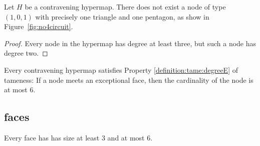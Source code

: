 \begin{lemma}\label{lemma:nobad4}
Let $H$ be a contravening hypermap.
There does not exist a node of 
type $(1,0,1)$ with precisely one triangle and
one pentagon, as show in Figure~\ref{fig:no4circuit}. 
\end{lemma}

\begin{proof}  Every node in
the hypermap has degree at least three, but such a node
has degree two.
\end{proof}

\begin{lemma} \label{lemma:deg5}
Every contravening hypermap satisfies Property
\ref{definition:tame:degreeE} of tameness: If a node meets an
exceptional face, then the cardinality of the node is at most $6$.
\end{lemma}

\subsection{faces}

\begin{lemma}  Every face has has size at least $3$ and at most $6$.
\end{lemma}

